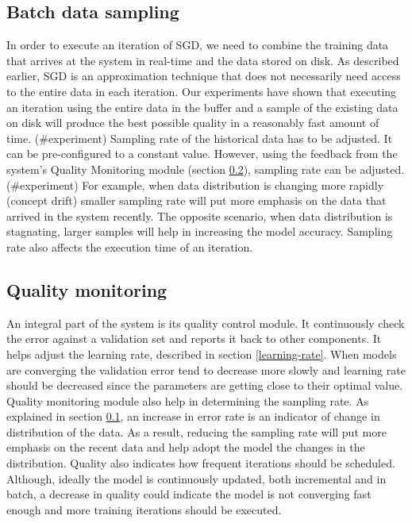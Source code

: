 \documentclass{sig-alternate-05-2015}
\begin{document}
\subsection{Batch data sampling} \label{sampling}
In order to execute an iteration of SGD, we need to combine the training data that arrives at the system in real-time and the data stored on disk.
As described earlier, SGD is an approximation technique that does not necessarily need access to the entire data in each iteration.
Our experiments have shown that executing an iteration using the entire data in the buffer and a sample of the existing data on disk will produce the best possible quality in a reasonably fast amount of time. (\#experiment)
Sampling rate of the historical data has to be adjusted.
It can be pre-configured to a constant value.
However, using the feedback from the system's Quality Monitoring module (section \ref{quality-monitoring}), sampling rate can be adjusted. (\#experiment)
For example, when data distribution is changing more rapidly (concept drift) smaller sampling rate will put more emphasis on the data that arrived in the system recently. 
The opposite scenario, when data distribution is stagnating, larger samples will help in increasing the model accuracy.
Sampling rate also affects the execution time of an iteration.

\subsection{Quality monitoring} \label{quality-monitoring}
An integral part of the system is its quality control module.
It continuously check the error against a validation set and reports it back to other components.
It helps adjust the learning rate, described in section \ref{learning-rate}. 
When models are converging the validation error tend to decrease more slowly and learning rate should be decreased since the parameters are getting close to their optimal value.
Quality monitoring module also help in determining the sampling rate. 
As explained in section \ref{sampling}, an increase in error rate is an indicator of change in distribution of the data.
As a result, reducing the sampling rate will put more emphasis on the recent data and help adopt the model the changes in the distribution.
Quality also indicates how frequent iterations should be scheduled. 
Although, ideally the model is continuously updated, both incremental and in batch, a decrease in quality could indicate the model is not converging fast enough and more training iterations should be executed.
\end{document}
